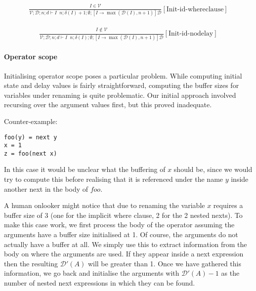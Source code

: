 \documentclass{scrartcl}
\DeclareMathOperator{\initrel}{\overset{init}{\Rightarrow}}
\begin{document}
    \begin{align*}
    \frac{
        \begin{matrix}
        I \in \mathcal{V}
        \end{matrix}
    }{
        \mathcal{V}; \mathcal{D}; n; d \vdash I \initrel n; \delta(I) + 1; \emptyset ; [I \to \max(\mathcal{D}(I), n+1)]\mathcal{D}
    }[\text{Init-id-whereclause}]
    \end{align*}
    
    \begin{align*}
    \frac{
        \begin{matrix}
        I \notin \mathcal{V}
        \end{matrix}
    }{
        \mathcal{V}; \mathcal{D}; n; d \vdash I \initrel n; \delta(I); \emptyset ; [I \to \max(\mathcal{D}(I), n+1)]\mathcal{D}
    }[\text{Init-id-nodelay}]
    \end{align*}
    
    \paragraph{Operator scope}
    
    Initialising operator scope poses a particular problem. While computing initial state and delay values is fairly straightforward, computing the buffer sizes for variables under renaming is quite problematic. Our initial approach involved recursing over the argument values first, but this proved inadequate.
    
    Counter-example:
    
    \begin{lstlisting}
foo(y) = next y
x = 1
z = foo(next x)
    \end{lstlisting}
    
    In this case it would be unclear what the buffering of $x$ should be, since we would try to compute this before realising that it is referenced under the name $y$ inside another next in the body of $foo$.
    
    A human onlooker might notice that due to renaming the variable $x$ requires a buffer size of 3 (one for the implicit where clause, 2 for the 2 nested nexts). To make this case work, we first process the body of the operator assuming the arguments have a buffer size initialised at 1. Of course, the arguments do not actually have a buffer at all. We simply use this to extract information from the body on where the arguments are used. If they appear inside a next expression then the resulting $\mathcal{D}'(A)$ will be greater than 1. Once we have gathered this information, we go back and initialise the arguments with $\mathcal{D}'(A)-1$ as the number of nested next expressions in which they can be found.
    
\end{document}
